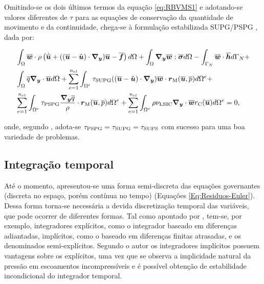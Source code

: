 Omitindo-se os dois últimos termos da equação \eqref{eq:RBVMS1} e adotando-se valores diferentes de $\tau$ para as equações de conservação da quantidade de movimento e da continuidade, chega-se à formulação estabilizada SUPG/PSPG \cite{tezduyar2000finite,tezduyar2003computation,catabriga2005compressible,catabriga2006compressible}, dada por:

\begin{equation}
    \begin{split}
        &\int_{\Omega}{\overline{\boldsymbol{w}}\cdot\rho\left({\dot{\overline{\boldsymbol{u}}}+((\overline{\boldsymbol{u}}-\hat{\boldsymbol{u}})\cdot\boldsymbol{\nabla_y})\overline{\boldsymbol{u}}-\overline{\boldsymbol{f}}}\right) d\Omega}+\int_{\Omega}{\boldsymbol{\nabla_y}\overline{\boldsymbol{w}}:\overline{\boldsymbol{\sigma}} d\Omega}-\int_{\Gamma_N}{\overline{\boldsymbol{w}}\cdot\overline{\boldsymbol{h}} d\Gamma_N}+\\
        &\int_{\Omega}{\overline{q}\boldsymbol{\nabla_y}\cdot\overline{\boldsymbol{u}} d\Omega}+\sum_{e=1}^{n_{el}}{\int_{\Omega^e}{\tau_{\mathrm{SUPG}}((\overline{\boldsymbol{u}}-\hat{\boldsymbol{u}})\cdot\boldsymbol{\nabla_y})\overline{\boldsymbol{w}}\cdot\boldsymbol{r}_\mathrm{M}(\overline{\boldsymbol{u}},\overline{p}) d\Omega^e}}+\\
        &\sum_{e=1}^{n_{el}}{\int_{\Omega^e}{\tau_{\mathrm{PSPG}}\frac{\boldsymbol{\nabla_y}\overline{q}}{\rho}\cdot\boldsymbol{r}_\mathrm{M}(\overline{\boldsymbol{u}},\overline{p}) d\Omega^e}}+\sum_{e=1}^{n_{el}}{\int_{\Omega^e}{\rho\nu_{\mathrm{LSIC}}\boldsymbol{\nabla_y}\cdot\overline{\boldsymbol{w}}r_\mathrm{C}(\overline{\boldsymbol{u}}) d\Omega^e}}=0
        \text{,}
        \label{eq:SUPG-PSPG}
    \end{split}
\end{equation}

\noindent onde, segundo , adota-se $\tau_{\mathrm{PSPG}}=\tau_{\mathrm{SUPG}}=\tau_{\mathrm{SUPS}}$ com sucesso para uma boa variedade de problemas.

\subsection{Integração temporal} \label{IT-VMS}

Até o momento, apresentou-se uma forma semi-discreta das equações governantes (discreta no espaço, porém contínua no tempo) (Equações \eqref{Eq:Residuos-Euler}). Dessa forma torna-se necessária a devida discretização temporal das variáveis, que pode ocorrer de diferentes formas. Tal como apontado por , tem-se, por exemplo, integradores explícitos, como o integrador baseado em diferenças adiantadas, implícitos, como o baseado em diferenças finitas atrasadas, e os denominados semi-explícitos. Segundo o autor os integradores implícitos possuem vantagens sobre os explícitos, uma vez que se observa a implicidade natural da pressão em escoamentos incompressíveis e é possível obtenção de estabilidade incondicional do integrador temporal.

